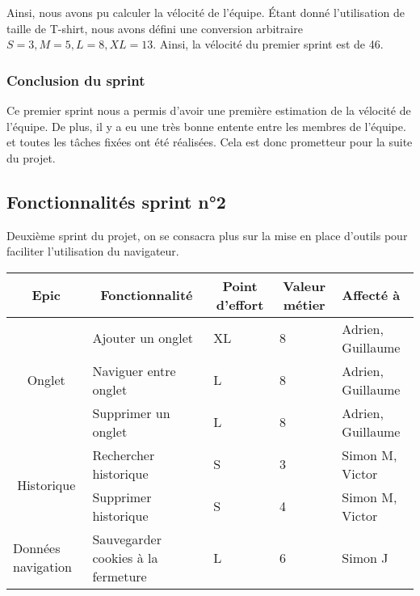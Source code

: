 \documentclass[10pt,a4paper]{article}
\begin{document}
Ainsi, nous avons pu calculer la vélocité de l'équipe. Étant donné l'utilisation de taille de T-shirt, nous avons défini une conversion arbitraire $S = 3, M = 5, L = 8, XL = 13$. Ainsi, la vélocité du premier sprint est de 46.

\subsubsection{Conclusion du sprint}
Ce premier sprint nous a permis d'avoir une première estimation de la vélocité de l'équipe. De plus, il y a eu une très bonne entente entre les membres de l'équipe. et toutes les tâches fixées ont été réalisées. Cela est donc prometteur pour la suite du projet.


\subsection{Fonctionnalités sprint n°2}
Deuxième sprint du projet, on se consacra plus sur la mise en place d'outils pour faciliter l'utilisation du navigateur.

\begin{table}[h]
\begin{tabular}{|c|l|l|l|l|}
\hline
\textbf{Epic}                            & \multicolumn{1}{c|}{\textbf{Fonctionnalité}} & \multicolumn{1}{c|}{\textbf{Point d'effort}} & \multicolumn{1}{c|}{\textbf{Valeur métier}} & \textbf{Affecté à} \\ \hline
\multirow{3}{*}{Onglet}                  & Ajouter un onglet                            & XL                                           & 8                                           & Adrien, Guillaume  \\ \cline{2-5} 
                                         & Naviguer entre onglet                        & L                                            & 8                                           & Adrien, Guillaume  \\ \cline{2-5} 
                                         & Supprimer un onglet                          & L                                            & 8                                           & Adrien, Guillaume  \\ \hline
\multirow{2}{*}{Historique}              & Rechercher historique                        & S                                            & 3                                           & Simon M, Victor    \\ \cline{2-5} 
                                         & Supprimer historique                         & S                                            & 4                                           & Simon M, Victor    \\ \hline
\multicolumn{1}{|l|}{Données navigation} & Sauvegarder cookies à la fermeture           & L                                            & 6                                           & Simon J            \\ \hline
\end{tabular}
\end{table}
\end{document}
